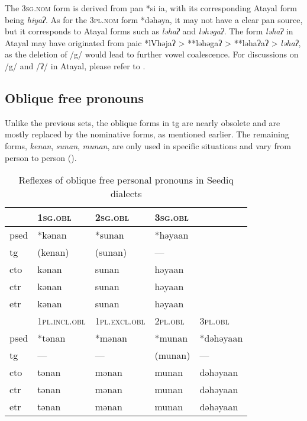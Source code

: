 The \textsc{3sg.nom} form is derived from \acs{pan} *si ia, with its corresponding Atayal form being \textit{hiyaʔ}. As for the \textsc{3pl.nom} form *dəhəya, it may not have a clear \acs{pan} source, but it corresponds to Atayal forms such as \textit{ləhaʔ} and \textit{ləhəgaʔ}. The form \textit{ləhaʔ} in Atayal may have originated from \acl{paic} *lVhəjaʔ > **ləhəgaʔ > **ləhaʔaʔ > \textit{ləhaʔ}, as the deletion of /g/ would lead to further vowel coalescence. For discussions on /g/ and /ʔ/ in Atayal, please refer to \textcite{goderich2020phd,song2023Aicgprime}. 

\subsection{Oblique free pronouns}

Unlike the previous sets, the oblique forms in \acl{tg} are nearly obsolete and are mostly replaced by the nominative forms, as mentioned earlier. The remaining forms, \textit{kenan}, \textit{sunan}, \textit{munan}, are only used in specific situations and vary from person to person (\cite{Sung2018Sedgrammar}).

\begin{table}[!htbp]
\centering
\caption{Reflexes of oblique free personal pronouns in Seediq dialects}
\label{tab:oblfree}
\begin{tabular}{lllll}
\hline
      & \textsc{1sg.obl}      & \textsc{2sg.obl}      & \textsc{3sg.obl} &           \\ \hline
\acs{psed} & *kənan       & *sunan       & *həyaan &           \\
\acs{tg}  & (kenan)      & (sunan)      & ---     &           \\
\acs{cto}  & kənan        & sunan        & həyaan  &           \\
\acs{ctr} & kənan        & sunan        & həyaan  &           \\
\acs{etr} & kənan        & sunan        & həyaan  &           \\ \hline
      & \textsc{1pl.incl.obl} & \textsc{1pl.excl.obl} & \textsc{2pl.obl} & \textsc{3pl.obl}   \\ \hline
\acs{psed} & *tənan       & *mənan       & *munan  & *dəhəyaan \\
\acs{tg}  & ---          & ---          & (munan) & ---       \\
\acs{cto}  & tənan        & mənan        & munan   & dəhəyaan  \\
\acs{ctr} & tənan        & mənan        & munan   & dəhəyaan  \\
\acs{etr} & tənan        & mənan        & munan   & dəhəyaan  \\ \hline
\end{tabular}
\end{table}

